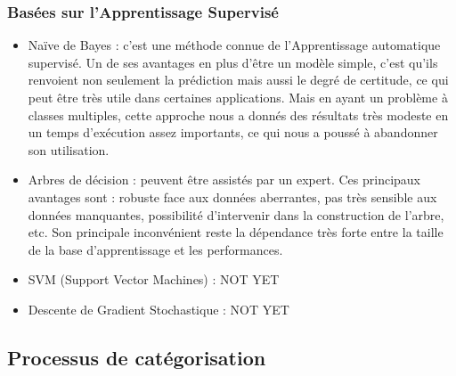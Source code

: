         \subsubsection{Basées sur l'Apprentissage Supervisé}
            \begin{itemize}
                \item{Naïve de Bayes : }
                c'est une méthode connue de l'Apprentissage automatique supervisé. Un de ses avantages en plus d'être un modèle simple, c'est qu'ils renvoient non seulement la prédiction mais aussi le degré de certitude, ce qui peut être très utile dans certaines applications. Mais en ayant un problème à classes multiples, cette approche nous a donnés des résultats très modeste en un temps d'exécution assez importants, ce qui nous a poussé à abandonner son utilisation.\\
                
                \item{Arbres de décision : }
                peuvent être assistés par un expert. Ces principaux avantages sont : robuste face aux données aberrantes, pas très sensible aux données manquantes, possibilité d'intervenir dans la construction de l'arbre, etc. Son principale inconvénient reste la dépendance très forte entre la taille de la base d'apprentissage et les performances.\\
                
                \item{SVM (Support Vector Machines) : }
                NOT YET
                \item{Descente de Gradient Stochastique : }
                NOT YET
            \end{itemize}

        \subsection{Processus de catégorisation}

